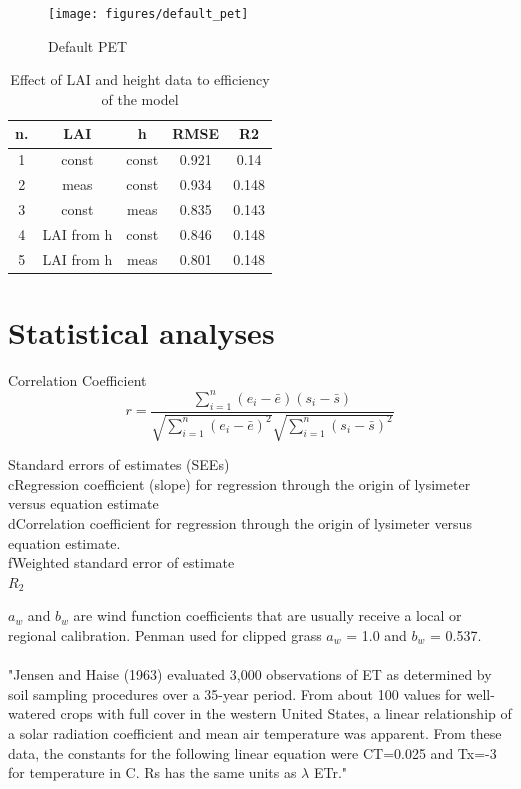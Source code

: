 \documentclass[hydrology,article,submit,moreauthors,pdftex]{Definitions/mdpi}
\begin{document}
\begin{figure}[H]
	\centering
	\texttt{[image: figures/default\_pet]}
	\caption{Default PET}
\end{figure}   
\begin{table}[H]
	\centering
	\caption{Effect of LAI and height data to efficiency of the model}
	\begin{tabular}{c|c|c|c|c}
		\toprule
		\textbf{n.} & \textbf{LAI} & \textbf{h} & \textbf{RMSE} & \textbf{R2} \\
		\midrule
		1 & const & const & 0.921 & 0.14 \\
		2 & meas & const & 0.934 & 0.148 \\
		3 & const & meas & 0.835 & 0.143 \\
		4 & LAI from h & const & 0.846 & 0.148 \\
		5 & LAI from h & meas & 0.801 & 0.148 \\
	\end{tabular}
\end{table}
\section{Statistical analyses}
Correlation Coefficient \\
\begin{equation}
r = \frac{\sum ^n _{i=1}(e_i - \bar{e})(s_i - \bar{s})}{\sqrt{\sum ^n _{i=1}(e_i - \bar{e})^2} \sqrt{\sum ^n _{i=1}(s_i - \bar{s})^2}}
\end{equation}



Standard errors of estimates (SEEs) \cite{jensen2016evaporation} \\
cRegression coefficient (slope) for regression through the origin of lysimeter versus equation estimate \\
dCorrelation coefficient for regression through the origin of lysimeter versus equation estimate. \\
fWeighted standard error of estimate\\
$R_2$ \cite{xu2002cross}

$a_w$ and $b_w$ are wind function coefficients that are usually receive a local or regional calibration.
Penman \cite{penman1963vegetation} used for clipped grass \cite{asce2005asce} $a_w$ = 1.0 and $b_w$ = 0.537.\\
\\
"Jensen and Haise (1963) evaluated 3,000 observations of ET as determined by soil sampling procedures over a 35-year period. From about 100 values for well-watered crops with full cover in the western United States, a linear relationship of a solar radiation coefficient and mean air temperature was apparent. From these data, the constants for the following linear equation were CT=0.025 and Tx=-3 for temperature in C. Rs has the same units as $\lambda$ ETr." \\
\end{document}
